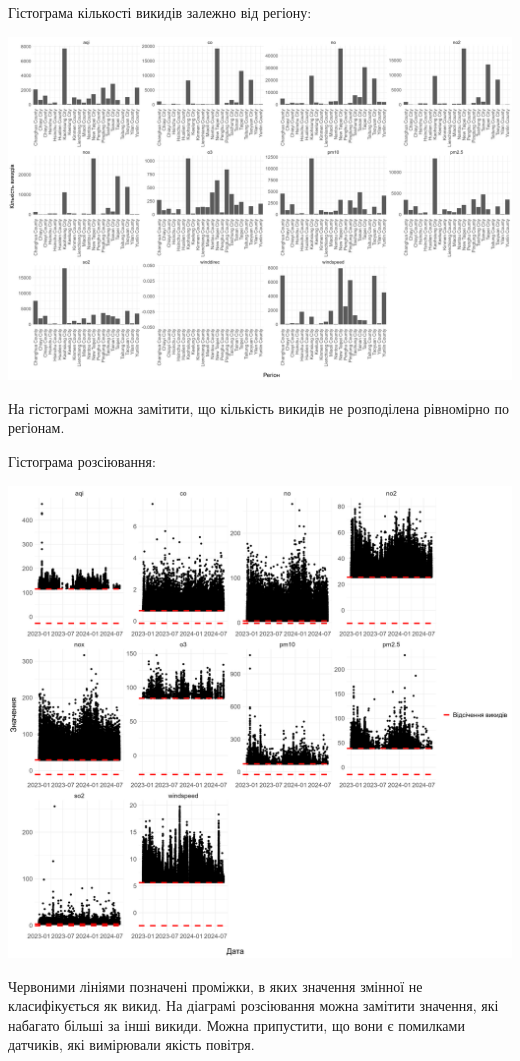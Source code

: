 \documentclass{article}
\begin{document}
\begin{enumerate}
    Гістограма кількості викидів залежно від регіону:

    \includegraphics[width=6in]{../../plots/outliers/count-bar-county.png}

    На гістограмі можна замітити, що кількість викидів не розподілена рівномірно
    по регіонам.

    \pagebreak

    Гістограма розсіювання:

    \includegraphics[width=6in]{outliers/scatter.png}

    Червоними лініями позначені проміжки, в яких значення змінної не класифікується
    як викид. На діаграмі розсіювання можна замітити значення, які набагато більші за
    інші викиди. Можна припустити, що вони є помилками датчиків, які вимірювали якість
    повітря.


\end{enumerate}
\end{document}
